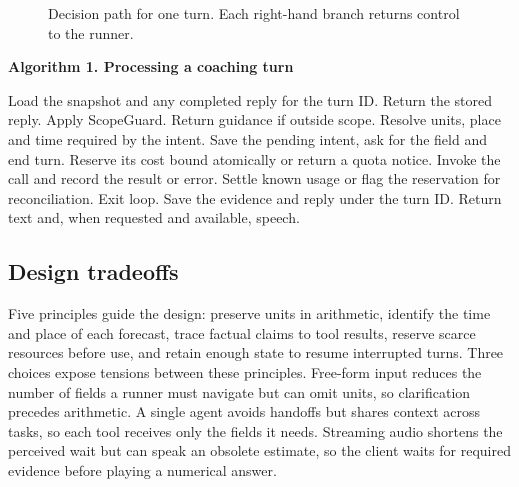 \documentclass[conference]{IEEEtran}
\begin{document}
\begin{figure}[htbp]\centering
{}
\caption{Decision path for one turn. Each right-hand branch returns control to the runner.}\label{fig:flow}
\end{figure}

\par\smallskip\noindent\textbf{Algorithm 1. Processing a coaching turn}
\begin{algorithmic}[1]
\STATE Load the snapshot and any completed reply for the turn ID.
  \STATE Return the stored reply.
\ENDIF
\STATE Apply ScopeGuard. Return guidance if outside scope.
\STATE Resolve units, place and time required by the intent.
  \STATE Save the pending intent, ask for the field and end turn.
\ENDIF
{}
  \STATE Reserve its cost bound atomically or return a quota notice.
  \STATE Invoke the call and record the result or error.
  \STATE Settle known usage or flag the reservation for reconciliation.
    \STATE Exit loop.
  \ENDIF
\ENDFOR
\STATE Save the evidence and reply under the turn ID.
\STATE Return text and, when requested and available, speech.
\end{algorithmic}

\subsection{Design tradeoffs}
Five principles guide the design: preserve units in arithmetic, identify the time and place of each forecast, trace factual claims to tool results, reserve scarce resources before use, and retain enough state to resume interrupted turns. Three choices expose tensions between these principles. Free-form input reduces the number of fields a runner must navigate but can omit units, so clarification precedes arithmetic. A single agent avoids handoffs but shares context across tasks, so each tool receives only the fields it needs. Streaming audio shortens the perceived wait but can speak an obsolete estimate, so the client waits for required evidence before playing a numerical answer.
\end{document}
